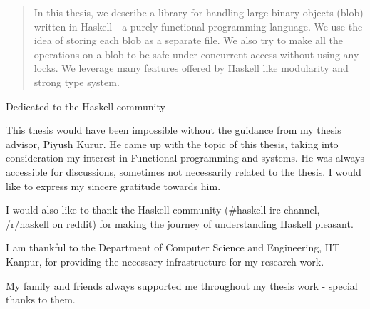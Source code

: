 \begin{abstract}
  In this thesis, we describe a library for handling large binary objects (blob) written in Haskell - a purely-functional programming language. We use the idea of storing each blob as a separate file. We also try to make all the operations on a blob to be safe under concurrent access without using any locks. We leverage many features offered by Haskell like modularity and strong type system.

\end{abstract}

\begin{dedication}
  Dedicated to the Haskell community
\end{dedication}

\begin{acknowledgments}
  This thesis would have been impossible without the guidance from my thesis advisor, Piyush Kurur.
  He came up with the topic of this thesis, taking into consideration my interest in Functional programming and
  systems. He was always accessible for discussions, sometimes not necessarily related to the thesis.
  I would like to express my sincere gratitude towards him.

  I would also like to thank the Haskell community (\#haskell irc channel, /r/haskell on reddit) for making
  the journey of understanding Haskell pleasant.

  I am thankful to the Department of Computer Science and Engineering, IIT Kanpur, for
  providing the necessary infrastructure for my research work.

  My family and friends always supported me throughout my thesis work - special thanks to them.
\end{acknowledgments}

\tableofcontents
\listoftables

\cleardoublepage
\listoffigures


\cleardoublepage{} %
